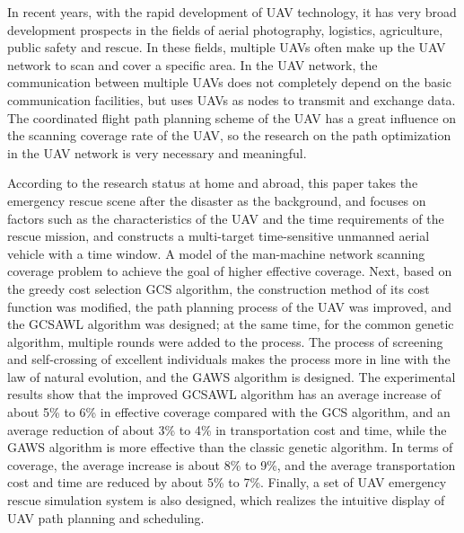 \begin{eabstract}
  In recent years, with the rapid development of UAV technology, it has very broad development prospects in the fields of aerial photography,
  logistics, agriculture, public safety and rescue. In these fields, multiple UAVs often make up the UAV network to scan and cover a specific area. In the UAV network, 
  the communication between multiple UAVs does not completely depend on the basic communication facilities, but uses UAVs as nodes to transmit and exchange data.
  The coordinated flight path planning scheme of the UAV has a great influence on the scanning coverage rate of the UAV, so the research on the path optimization in the UAV network is 
  very necessary and meaningful.


  According to the research status at home and abroad, this paper takes the emergency rescue scene after the disaster as the background, and focuses on factors such as the characteristics of 
  the UAV and the time requirements of the rescue mission, and constructs a multi-target time-sensitive unmanned aerial vehicle with a time window. A model of the man-machine network scanning
  coverage problem to achieve the goal of higher effective coverage. Next, based on the greedy cost selection GCS algorithm, the construction method of its cost function was modified, the path
  planning process of the UAV was improved, and the GCSAWL algorithm was designed; at the same time, for the common genetic algorithm, multiple rounds were added to the process. The process 
  of screening and self-crossing of excellent individuals makes the process more in line with the law of natural evolution, and the GAWS algorithm is designed. The experimental results show 
  that the improved GCSAWL algorithm has an average increase of about 5\% to 6\% in effective coverage compared with the GCS algorithm, and an average reduction of about 3\% to 4\% in 
  transportation cost and time, while the GAWS algorithm is more effective than the classic genetic algorithm. In terms of coverage, the average increase is about 8\% to 9\%, and the average transportation
  cost and time are reduced by about 5\% to 7\%. Finally, a set of UAV emergency rescue simulation system is also designed, which realizes the intuitive display of UAV path planning and 
  scheduling.
\end{eabstract}
